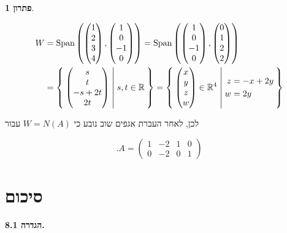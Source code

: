 \documentclass[12pt]{report}
\theoremstyle{plain}
\theoremstyle{definition}
\newtheorem*{solution}{פתרון}
\newcommand{\R}{\mathbb{R}}
\newcommand{\0}{\mathbf{0}}
\DeclareMathOperator{\Span}{Span}
\begin{document}
\begin{solution}
\begin{enumerate}[label=\alph*.]
$$
\begin{aligned}
W&=\Span\left(\begin{pmatrix}
1 \\
2 \\
3 \\
4
\end{pmatrix},\begin{pmatrix}
1 \\
0 \\
-1 \\
0
\end{pmatrix}\right)=\Span\left(\begin{pmatrix}
1 \\
0 \\
-1 \\
0
\end{pmatrix},\begin{pmatrix}
0 \\
1 \\
2 \\
2
\end{pmatrix}\right) \\
&=\Set{\begin{pmatrix}
s \\
t \\
-s+2t \\
2t
\end{pmatrix}|s,t\in\R}=\Set{\begin{pmatrix}
x \\
y \\
z \\
w
\end{pmatrix}\in\R^4|\begin{aligned}z&=-x+2y\\w&=2y\end{aligned}}
\end{aligned}
$$

לכן, לאחר העברת אגפים שוב נובע כי
$W=N(A)$
עבור

$$
.A=\begin{pmatrix}
1 & -2 & 1 & 0 \\
0 & -2 & 0 & 1
\end{pmatrix}
$$


\end{enumerate}
\end{solution}

\clearpage
\section{סיכום}
\noindent\textbf{הגדרה 8.1.}
\end{document}
